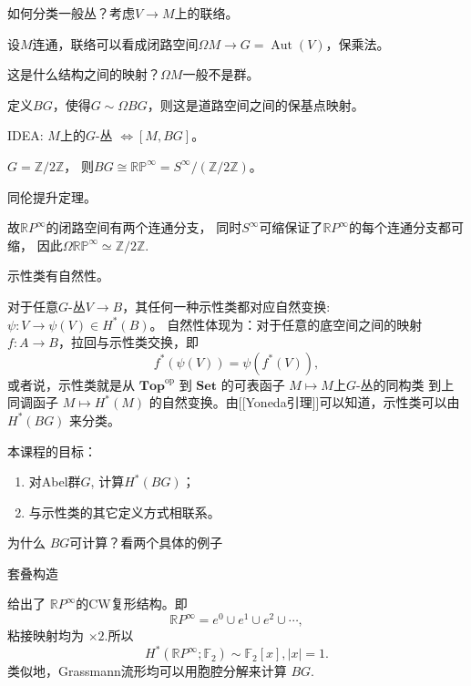 \qquad 如何分类一般丛？考虑$V \rightarrow M$上的联络。

\qquad 设$M$连通，联络可以看成闭路空间$\Omega M \rightarrow G= \operatorname{Aut}(V)$，保乘法。

\qquad 这是什么结构之间的映射？$\Omega M$一般不是群。

\qquad 定义$BG$，使得$G \sim \Omega BG$，则这是道路空间之间的保基点映射。

\qquad IDEA: $M$上的$G$-丛 $\iff [M, BG]$。

\begin{example}
    $G= \mathbb{Z}/ 2\mathbb{Z}$，
    则$BG\cong \mathbb{RP}^\infty = S^\infty/(\mathbb{Z}/ 2\mathbb{Z})$。

同伦提升定理。
    
    \qquad 故$\mathbb{R}P^\infty$的闭路空间有两个连通分支，
    同时$S^\infty$可缩保证了$\mathbb{R}P^{\infty}$的每个连通分支都可缩，
    因此$\Omega \mathbb{RP}^\infty \simeq \mathbb{Z}/ 2\mathbb{Z}$.

\end{example}


\qquad 示性类有自然性。

\qquad 对于任意$G$-丛$V\rightarrow B$，其任何一种示性类都对应自然变换:
$\psi: V\to \psi(V)\in H^*(B)$。
自然性体现为：对于任意的底空间之间的映射$f: A\rightarrow B$，拉回与示性类交换，即
        $$f^*(\psi(V)) = \psi( f^*(V)),$$
或者说，示性类就是从
$\mathbf{Top}^{\mathrm{op}}$
到
$\mathbf{Set}$
的可表函子
$M\mapsto M\text{上}G\text{-丛的同构类}$ 到上同调函子 $M\mapsto H^*(M)$
的自然变换。由[[Yoneda引理]]可以知道，示性类可以由 $H^*(BG)$ 来分类。

\qquad 本课程的目标：
\begin{enumerate}
    \item 对Abel群$G$, 计算$H^*(BG)$；
    \item 与示性类的其它定义方式相联系。
\end{enumerate}

\qquad 为什么 $BG$可计算？看两个具体的例子

\begin{example}
    套叠构造
    给出了 $\mathbb{R}P^\infty$的CW复形结构。即
    $$
        \mathbb{R}P^\infty=e^0 \cup e^1 \cup e^2 \cup \cdots,
    $$
    粘接映射均为 $\times 2$.所以
    $$
        H^*(\mathbb{R}P^\infty;\mathbb{F}_2)\sim \mathbb{F}_2[x], |x|=1.
    $$
    类似地，Grassmann流形均可以用胞腔分解来计算 $BG$.
\end{example}

